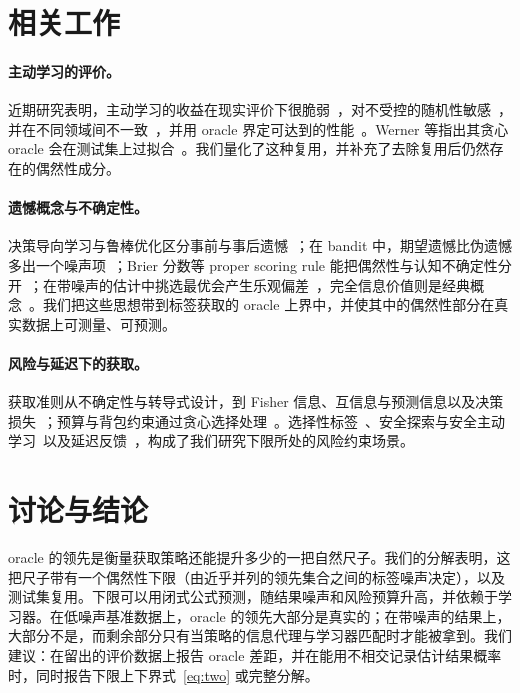\documentclass[runningheads]{llncs}
\begin{document}
\section{相关工作}
\label{sec:related}
\paragraph{主动学习的评价。}近期研究表明，主动学习的收益在现实评价下很脆弱~\cite{luth2023navigating}，对不受控的随机性敏感~\cite{ji2023randomness}，并在不同领域间不一致~\cite{werner2023comparable,werner2024cdalbench}，并用 oracle 界定可达到的性能~\cite{werner2024cdalbench,huseljic2026boss}。Werner 等指出其贪心 oracle 会在测试集上过拟合~\cite{werner2023comparable}。我们量化了这种复用，并补充了去除复用后仍然存在的偶然性成分。

\paragraph{遗憾概念与不确定性。}决策导向学习与鲁棒优化区分事前与事后遗憾~\cite{schutte2023robust}；在 bandit 中，期望遗憾比伪遗憾多出一个噪声项~\cite{bubeck2012regret,audibert2010regret}；Brier 分数等 proper scoring rule 能把偶然性与认知不确定性分开~\cite{hofman2024quantifying}；在带噪声的估计中挑选最优会产生乐观偏差~\cite{smith2006optimizer,cawley2010overfitting}，完全信息价值则是经典概念~\cite{howard1966information,raiffa1961applied}。我们把这些思想带到标签获取的 oracle 上界中，并使其中的偶然性部分在真实数据上可测量、可预测。

\paragraph{风险与延迟下的获取。}获取准则从不确定性与转导式设计，到 Fisher 信息、互信息与预测信息以及决策损失~\cite{cohn1996active,settles2009active,lewis1994sequential,yu2006transductive,ash2021fishing,kirsch2019batchbald,bickfordsmith2023prediction,huang2026loss,chaloner1995bayesian}；预算与背包约束通过贪心选择处理~\cite{krause2005near,sviridenko2004note,tomanek2010cost}。选择性标签~\cite{lakkaraju2017selective,wei2021selective,kilbertus2020fair,keswani2024partial,crook2004reject}、安全探索与安全主动学习~\cite{sui2015safe,schreiter2015safe,wu2016conservative}以及延迟反馈~\cite{joulani2013delayed,chapelle2014delayed,pham2022latency}，构成了我们研究下限所处的风险约束场景。

\section{讨论与结论}
\label{sec:conclusion}
oracle 的领先是衡量获取策略还能提升多少的一把自然尺子。我们的分解表明，这把尺子带有一个偶然性下限（由近乎并列的领先集合之间的标签噪声决定），以及测试集复用。下限可以用闭式公式预测，随结果噪声和风险预算升高，并依赖于学习器。在低噪声基准数据上，oracle 的领先大部分是真实的；在带噪声的结果上，大部分不是，而剩余部分只有当策略的信息代理与学习器匹配时才能被拿到。我们建议：在留出的评价数据上报告 oracle 差距，并在能用不相交记录估计结果概率时，同时报告下限上下界式~\eqref{eq:two} 或完整分解。
\end{document}
